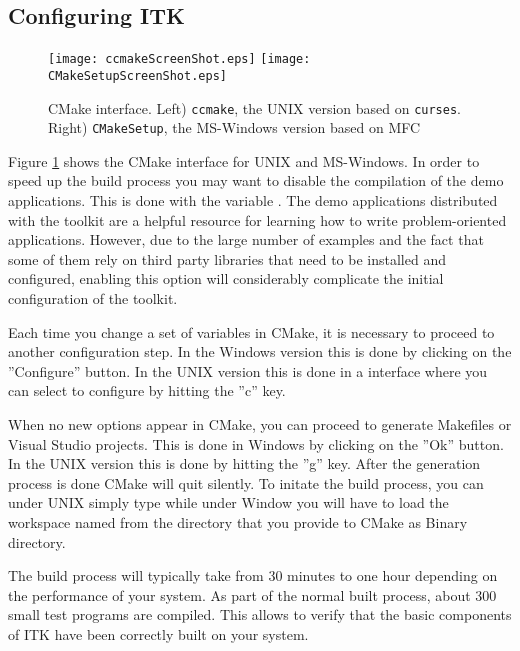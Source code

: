 \subsection{Configuring ITK}
\label{sec:ConfiguringITKwithVTK}
  

\begin{figure}[ht]
\centering 
\texttt{[image: ccmakeScreenShot.eps]}
\texttt{[image: CMakeSetupScreenShot.eps]}
\caption{CMake interface. Left) \texttt{ccmake}, the UNIX version based on
\texttt{curses}. Right) \texttt{CMakeSetup}, the MS-Windows version based on MFC}
\label{fig:CMakeGUI}
\end{figure}

Figure \ref{fig:CMakeGUI} shows the CMake interface for UNIX and MS-Windows.
In order to speed up the build process you may want to disable the
compilation of the demo applications. This is done with the variable
. The demo applications  distributed with the
toolkit are a helpful resource for learning how to write problem-oriented
applications.  However, due to the large number of examples and the fact that
some of them rely on third party libraries that need to be installed and
configured, enabling this option will considerably complicate the initial
configuration of the toolkit.

Each time you change a set of variables in CMake, it is necessary to proceed
to another configuration step. In the Windows version this is done by
clicking on the ''Configure'' button. In the UNIX version this is done in a
 interface where you can select to configure by hitting the
''c'' key.

When no new options appear in CMake, you can proceed to generate Makefiles or
Visual Studio projects. This is done in Windows by clicking on the ''Ok''
button.  In the UNIX version this is done by hitting the ''g'' key. After the
generation process is done CMake will quit silently. To initate the build
process, you can under UNIX simply type  while under Window you
will have to load the workspace named  from the directory that
you provide to CMake as Binary directory.

The build process will typically take from 30 minutes to one hour depending
on the performance of your system. As part of the normal built process, about
300 small test programs are compiled. This allows to verify that the basic
components of ITK have been correctly built on your system.


